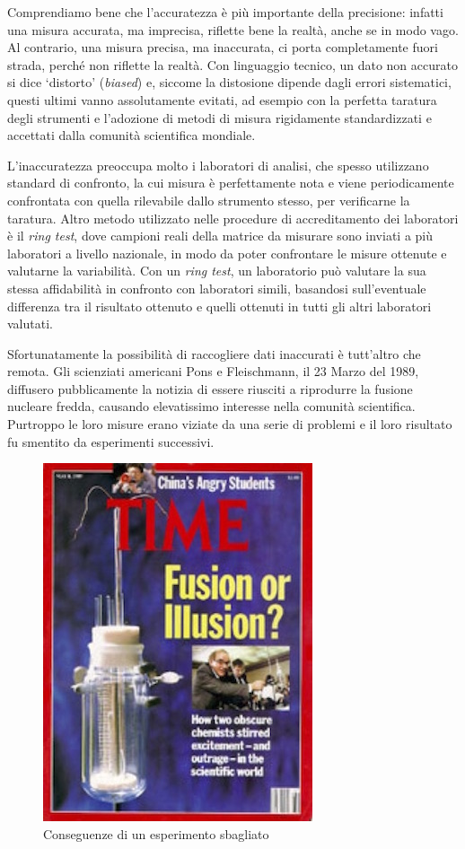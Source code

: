 \documentclass[a4paper,12pt,oneside]{book}
\begin{document}
Comprendiamo bene che l'accuratezza è più importante della precisione: infatti una misura accurata, ma imprecisa, riflette bene la realtà, anche se in modo vago. Al contrario, una misura precisa, ma inaccurata, ci porta completamente fuori strada, perché non riflette la realtà. Con linguaggio tecnico, un dato non accurato si dice `distorto' (\emph{biased}) e, siccome la distosione dipende dagli errori sistematici, questi ultimi vanno assolutamente evitati, ad esempio con la perfetta taratura degli strumenti e l'adozione di metodi di misura rigidamente standardizzati e accettati dalla comunità scientifica mondiale.

L'inaccuratezza preoccupa molto i laboratori di analisi, che spesso utilizzano standard di confronto, la cui misura è perfettamente nota e viene periodicamente confrontata con quella rilevabile dallo strumento stesso, per verificarne la taratura. Altro metodo utilizzato nelle procedure di accreditamento dei laboratori è il \emph{ring test}, dove campioni reali della matrice da misurare sono inviati a più laboratori a livello nazionale, in modo da poter confrontare le misure ottenute e valutarne la variabilità. Con un \emph{ring test}, un laboratorio può valutare la sua stessa affidabilità in confronto con laboratori simili, basandosi sull'eventuale differenza tra il risultato ottenuto e quelli ottenuti in tutti gli altri laboratori valutati.

Sfortunatamente la possibilità di raccogliere dati inaccurati è tutt'altro che remota. Gli scienziati americani Pons e Fleischmann, il 23 Marzo del 1989, diffusero pubblicamente la notizia di essere riusciti a riprodurre la fusione nucleare fredda, causando elevatissimo interesse nella comunità scientifica. Purtroppo le loro misure erano viziate da una serie di problemi e il loro risultato fu smentito da esperimenti successivi.

\begin{figure}

{\centering \includegraphics[width=0.5\linewidth]{_images/FalseResults} 

}

\caption{Conseguenze di un esperimento sbagliato}\label{fig:figName2}
\end{figure}
\end{document}
